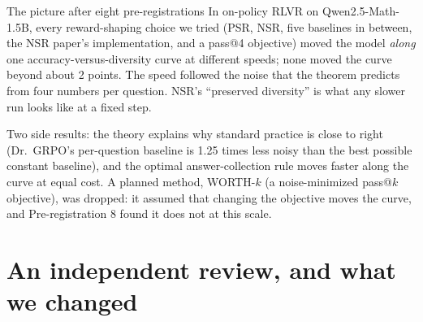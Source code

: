\documentclass[11pt]{article}
\begin{document}
\begin{idea}{The picture after eight pre-registrations}
In on-policy RLVR on Qwen2.5-Math-1.5B, every reward-shaping choice we tried (PSR, NSR, five baselines in between, the NSR paper's implementation, and a pass@4 objective) moved the model \emph{along} one accuracy-versus-diversity curve at different speeds; none moved the curve beyond about 2 points. The speed followed the noise that the theorem predicts from four numbers per question. NSR's ``preserved diversity'' is what any slower run looks like at a fixed step.
\end{idea}
Two side results: the theory explains why standard practice is close to right (Dr.\ GRPO's per-question baseline is 1.25 times less noisy than the best possible constant baseline), and the optimal answer-collection rule moves faster along the curve at equal cost. A planned method, WORTH-$k$ (a noise-minimized pass@$k$ objective), was dropped: it assumed that changing the objective moves the curve, and Pre-registration 8 found it does not at this scale.

\section{An independent review, and what we changed}
\end{document}
